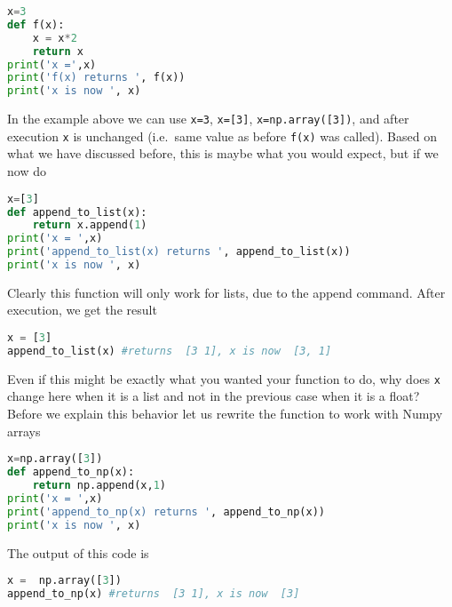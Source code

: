 \documentclass[graybox,sectrefs,envcountresetchap,open=right,final]{svmonodo}
\begin{document}
\begin{lstlisting}[language=python,style=blue1bar]
x=3
def f(x):
    x = x*2
    return x
print('x =',x)
print('f(x) returns ', f(x))
print('x is now ', x)

\end{lstlisting}

In the example above we can use \texttt{x=3}, \texttt{x=[3]}, \texttt{x=np.array([3])}, and after execution \texttt{x} is unchanged (i.e.~same value as before \texttt{f(x)} was called). Based on what we have discussed before, this is maybe what you would expect, but if we now do







\begin{lstlisting}[language=python,style=blue1bar]
x=[3]
def append_to_list(x):
    return x.append(1)
print('x = ',x)
print('append_to_list(x) returns ', append_to_list(x))
print('x is now ', x)

\end{lstlisting}

Clearly this function will only work for lists, due to the append command. After execution, we get the result



\begin{lstlisting}[language=python,style=blue1bar]
x = [3]
append_to_list(x) #returns  [3 1], x is now  [3, 1]

\end{lstlisting}

Even if this might be exactly what you wanted your function to do, why does \texttt{x} change here when it is a list and not in the previous case when it is a float? Before we explain this behavior let us rewrite the function to work with Numpy arrays







\begin{lstlisting}[language=python,style=blue1bar]
x=np.array([3])
def append_to_np(x):
    return np.append(x,1)
print('x = ',x)
print('append_to_np(x) returns ', append_to_np(x))
print('x is now ', x)

\end{lstlisting}

The output of this code is



\begin{lstlisting}[language=python,style=blue1bar]
x =  np.array([3])
append_to_np(x) #returns  [3 1], x is now  [3]

\end{lstlisting}
\end{document}
